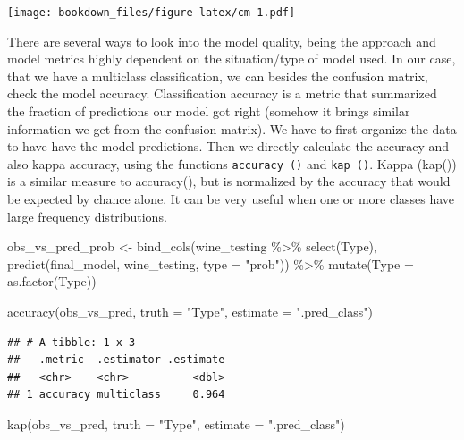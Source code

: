 \documentclass[
]{krantz}
\makeatletter
\newenvironment{Shaded}{\begin{snugshade}}{\end{snugshade}}
\newcommand{\AttributeTok}[1]{\textcolor[rgb]{0.61,0.61,0.61}{#1}}
\newcommand{\FunctionTok}[1]{\textcolor[rgb]{0,0,0}{#1}}
\newcommand{\NormalTok}[1]{#1}
\newcommand{\OtherTok}[1]{\textcolor[rgb]{0.37,0.37,0.37}{#1}}
\newcommand{\SpecialCharTok}[1]{\textcolor[rgb]{0,0,0}{#1}}
\newcommand{\StringTok}[1]{\textcolor[rgb]{0.5,0.5,0.5}{#1}}
\newenvironment{kframe}{%
\medskip{}
\setlength{\fboxsep}{.8em}
 \def\at@end@of@kframe{}%
 \ifinner\ifhmode%
  \def\at@end@of@kframe{\end{minipage}}%
  \begin{minipage}{\columnwidth}%
 \fi\fi%
 \def\FrameCommand##1{\hskip\@totalleftmargin \hskip-\fboxsep
 \colorbox{shadecolor}{##1}\hskip-\fboxsep
     \hskip-\linewidth \hskip-\@totalleftmargin \hskip\columnwidth}%
 \MakeFramed {\advance\hsize-\width
   \@totalleftmargin\z@ \linewidth\hsize
   \@setminipage}}%
 {\par\unskip\endMakeFramed%
 \at@end@of@kframe}
\renewenvironment{Shaded}{\begin{kframe}}{\end{kframe}}
\makeatother
\begin{document}
\texttt{[image: bookdown\_files/figure-latex/cm-1.pdf]}

There are several ways to look into the model quality, being the approach and model metrics highly dependent on the situation/type of model used. In our case, that we have a multiclass classification, we can besides the confusion matrix, check the model accuracy. Classification accuracy is a metric that summarized the fraction of predictions our model got right (somehow it brings similar information we get from the confusion matrix). We have to first organize the data to have have the model predictions. Then we directly calculate the accuracy and also kappa accuracy, using the functions \texttt{accuracy\ ()} and \texttt{kap\ ()}. Kappa (kap()) is a similar measure to accuracy(), but is normalized by the accuracy that would be expected by chance alone. It can be very useful when one or more classes have large frequency distributions.

\begin{Shaded}
\begin{Highlighting}[]
\NormalTok{obs\_vs\_pred\_prob }\OtherTok{\textless{}{-}} \FunctionTok{bind\_cols}\NormalTok{(wine\_testing }\SpecialCharTok{\%\textgreater{}\%} 
                                \FunctionTok{select}\NormalTok{(Type), }
                              \FunctionTok{predict}\NormalTok{(final\_model, }
\NormalTok{                                      wine\_testing, }
                                      \AttributeTok{type =} \StringTok{"prob"}\NormalTok{)) }\SpecialCharTok{\%\textgreater{}\%} 
  \FunctionTok{mutate}\NormalTok{(}\AttributeTok{Type =} \FunctionTok{as.factor}\NormalTok{(Type))}

\FunctionTok{accuracy}\NormalTok{(obs\_vs\_pred, }\AttributeTok{truth =} \StringTok{"Type"}\NormalTok{, }\AttributeTok{estimate =} \StringTok{".pred\_class"}\NormalTok{)}
\end{Highlighting}
\end{Shaded}

\begin{verbatim}
## # A tibble: 1 x 3
##   .metric  .estimator .estimate
##   <chr>    <chr>          <dbl>
## 1 accuracy multiclass     0.964
\end{verbatim}

\begin{Shaded}
\begin{Highlighting}[]
\FunctionTok{kap}\NormalTok{(obs\_vs\_pred, }\AttributeTok{truth =} \StringTok{"Type"}\NormalTok{, }\AttributeTok{estimate =} \StringTok{".pred\_class"}\NormalTok{)}
\end{Highlighting}
\end{Shaded}
\end{document}
